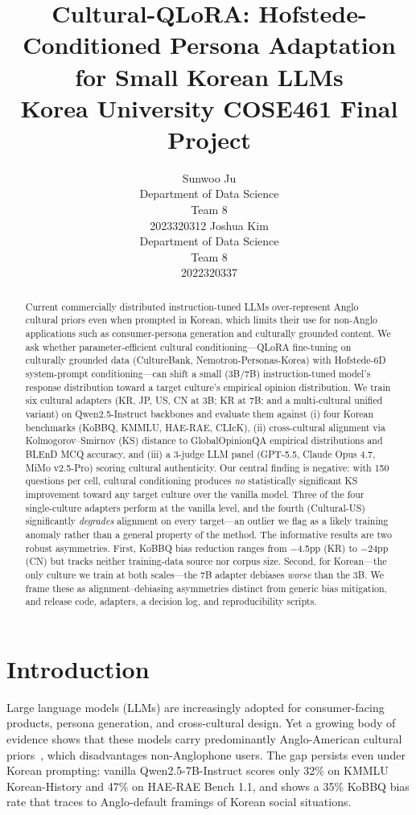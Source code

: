 \documentclass{article}
\title{
  Cultural-QLoRA: Hofstede-Conditioned Persona Adaptation for Small Korean LLMs \\
  \vspace{1em}
  \small{\normalfont Korea University COSE461 Final Project}
}
\author{
  Sunwoo Ju \\
  Department of Data Science \\
  Team 8 \\
  2023320312
  \And
  Joshua Kim \\
  Department of Data Science \\
  Team 8 \\
  2022320337
}
\begin{document}
\maketitle




\begin{abstract}
Current commercially distributed instruction-tuned LLMs over-represent Anglo cultural priors even when prompted in Korean, which limits their use for non-Anglo applications such as consumer-persona generation and culturally grounded content. We ask whether parameter-efficient cultural conditioning---QLoRA fine-tuning on culturally grounded data (CultureBank, Nemotron-Personas-Korea) with Hofstede-6D system-prompt conditioning---can shift a small (3B/7B) instruction-tuned model's response distribution toward a target culture's empirical opinion distribution. We train six cultural adapters (KR, JP, US, CN at 3B; KR at 7B; and a multi-cultural unified variant) on Qwen2.5-Instruct backbones and evaluate them against (i) four Korean benchmarks (KoBBQ, KMMLU, HAE-RAE, CLIcK), (ii) cross-cultural alignment via Kolmogorov--Smirnov (KS) distance to GlobalOpinionQA empirical distributions and BLEnD MCQ accuracy, and (iii) a 3-judge LLM panel (GPT-5.5, Claude Opus 4.7, MiMo v2.5-Pro) scoring cultural authenticity. Our central finding is negative: with 150 questions per cell, cultural conditioning produces \emph{no} statistically significant KS improvement toward any target culture over the vanilla model. Three of the four single-culture adapters perform at the vanilla level, and the fourth (Cultural-US) significantly \emph{degrades} alignment on every target---an outlier we flag as a likely training anomaly rather than a general property of the method. The informative results are two robust asymmetries. First, KoBBQ bias reduction ranges from $-$4.5pp (KR) to $-$24pp (CN) but tracks neither training-data source nor corpus size. Second, for Korean---the only culture we train at both scales---the 7B adapter debiases \emph{worse} than the 3B. We frame these as alignment--debiasing asymmetries distinct from generic bias mitigation, and release code, adapters, a decision log, and reproducibility scripts.
\end{abstract}

\section{Introduction}
\label{sec:intro}

Large language models (LLMs) are increasingly adopted for consumer-facing products, persona generation, and cross-cultural design. Yet a growing body of evidence shows that these models carry predominantly Anglo-American cultural priors~\cite{durmus2023global,cao2023assessing}, which disadvantages non-Anglophone users. The gap persists even under Korean prompting: vanilla Qwen2.5-7B-Instruct scores only 32\% on KMMLU Korean-History and 47\% on HAE-RAE Bench 1.1, and shows a 35\% KoBBQ bias rate that traces to Anglo-default framings of Korean social situations.
\end{document}
